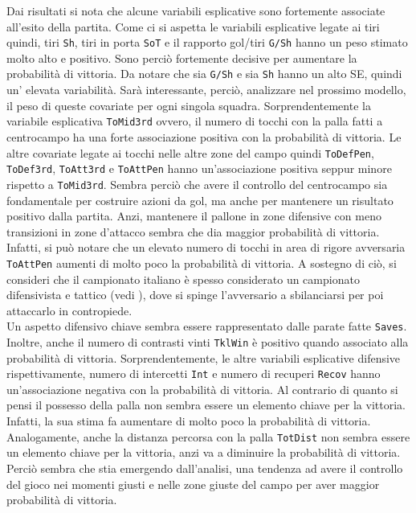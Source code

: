 Dai risultati si nota che alcune variabili esplicative sono fortemente associate all'esito della partita. Come ci si aspetta le variabili esplicative legate ai tiri quindi, tiri \texttt{Sh}, tiri in porta \texttt{SoT} e il rapporto gol/tiri \texttt{G/Sh} hanno un peso stimato molto alto e positivo. Sono perciò fortemente decisive per aumentare la probabilità di vittoria. Da notare che sia \texttt{G/Sh} e sia \texttt{Sh} hanno un alto SE, quindi un' elevata variabilità. Sarà interessante, perciò, analizzare nel prossimo modello, il peso di queste covariate per ogni singola squadra.
Sorprendentemente la variabile esplicativa \texttt{ToMid3rd} ovvero, il numero di tocchi con la palla fatti a centrocampo ha una forte associazione positiva con la probabilità di vittoria. Le altre covariate legate ai tocchi nelle altre zone del campo quindi \texttt{ToDefPen}, \texttt{ToDef3rd}, \texttt{ToAtt3rd} e \texttt{ToAttPen} hanno un'associazione positiva seppur minore rispetto a \texttt{ToMid3rd}. Sembra perciò che avere il controllo del centrocampo sia fondamentale per costruire azioni da gol, ma anche per mantenere un risultato positivo dalla partita. Anzi, mantenere il pallone in zone difensive con meno transizioni in zone d'attacco sembra che dia maggior probabilità di vittoria. Infatti, si può notare che un elevato numero di tocchi in area di rigore avversaria \texttt{ToAttPen} aumenti di molto poco la probabilità di vittoria. A sostegno di ciò, si consideri che il campionato italiano è spesso considerato un campionato difensivista e tattico (vedi \textit{\cite{speculazione}}), dove si spinge l'avversario a sbilanciarsi per poi attaccarlo in contropiede.\\
Un aspetto difensivo chiave sembra essere rappresentato dalle parate fatte \texttt{Saves}. Inoltre, anche il numero di contrasti vinti \texttt{TklWin} è positivo quando associato alla probabilità di vittoria. Sorprendentemente, le altre variabili esplicative difensive rispettivamente, numero di intercetti \texttt{Int} e numero di recuperi \texttt{Recov} hanno un'associazione negativa con la probabilità di vittoria. Al contrario di quanto si pensi il possesso della palla non sembra essere un elemento chiave per la vittoria. Infatti, la sua stima fa aumentare di molto poco la probabilità di vittoria. Analogamente, anche la distanza percorsa con la palla \texttt{TotDist} non sembra essere un elemento chiave per la vittoria, anzi va a diminuire la probabilità di vittoria. Perciò sembra che stia emergendo dall'analisi, una tendenza ad avere il controllo del gioco nei momenti giusti e nelle zone giuste del campo per aver maggior probabilità di vittoria.\\
